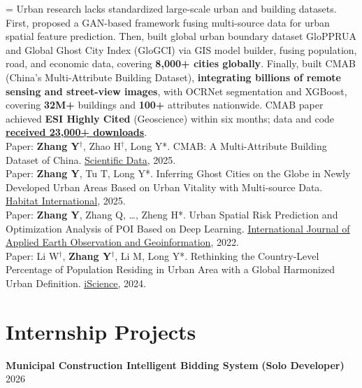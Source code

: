 \documentclass[10pt,a4paper]{article}
\let\oldhref\href
\renewcommand{\href}[2]{\oldhref{#1}{\underline{#2}}}
\newcommand{\project}[3]{%
  \vspace{1pt}
  {\textbf{#1}} {\textbf{(#3)}} \hfill {\color{lightgray}#2}\par\vspace{0pt}
}
\newlength{\projectnumwidth}
\begin{document}
\begingroup\leftskip=\projectnumwidth
Urban research lacks standardized large-scale urban and building datasets. First, proposed a GAN-based framework fusing multi-source data for urban spatial feature prediction. Then, built global urban boundary dataset GloPPRUA and Global Ghost City Index (GloGCI) via GIS model builder, fusing population, road, and economic data, covering \textbf{8,000+ cities globally}. Finally, built CMAB (China's Multi-Attribute Building Dataset), \textbf{integrating billions of remote sensing and street-view images}, with OCRNet segmentation and XGBoost, covering \textbf{32M+} buildings and \textbf{100+} attributes nationwide. CMAB paper achieved \textbf{ESI Highly Cited} (Geoscience) within six months; data and code \href{https://figshare.com/authors/Yecheng_Zhang/20402873}{\textbf{received 23,000+ downloads}}.\\[2pt]
{Paper: \textbf{Zhang Y}$^{\dag}$, Zhao H$^{\dag}$, Long Y*. CMAB: A Multi-Attribute Building Dataset of China. \href{https://doi.org/10.1038/s41597-025-04730-5}{Scientific Data}, 2025.\\
Paper: \textbf{Zhang Y}, Tu T, Long Y*. Inferring Ghost Cities on the Globe in Newly Developed Urban Areas Based on Urban Vitality with Multi-source Data. \href{https://doi.org/10.1016/j.habitatint.2025.103350}{Habitat International}, 2025.\\
Paper: \textbf{Zhang Y}, Zhang Q, \ldots, Zheng H*. Urban Spatial Risk Prediction and Optimization Analysis of POI Based on Deep Learning. \href{https://doi.org/10.1016/j.jag.2022.102942}{International Journal of Applied Earth Observation and Geoinformation}, 2022.\\
Paper: Li W$^{\dag}$, \textbf{Zhang Y}$^{\dag}$, Li M, Long Y*. Rethinking the Country-Level Percentage of Population Residing in Urban Area with a Global Harmonized Urban Definition. \href{https://doi.org/10.1016/j.isci.2024.110125}{iScience}, 2024.}\par
\endgroup

\section{Internship Projects}

\project{Municipal Construction Intelligent Bidding System}{2026}
{Solo Developer}
\end{document}
